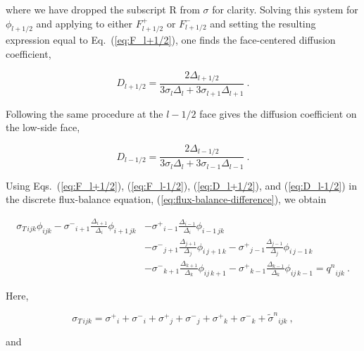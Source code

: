 \documentclass[preprint,12pt]{elsarticle}
\newcommand{\sign}{\ensuremath{\tilde{\sigma}^n}}
\newcommand{\qn}{\ensuremath{q^n}} \newcommand{\Tn}{\ensuremath{T^n}}
\newcommand{\Di}{\ensuremath{\Delta_i}}
\newcommand{\Dj}{\ensuremath{\Delta_j}}
\newcommand{\Dk}{\ensuremath{\Delta_k}}
\newcommand{\sigT}{\ensuremath{\sigma_{T\,ijk}}}
\newcommand{\sigm}{\ensuremath{\sigma^{-}}}
\newcommand{\sigp}{\ensuremath{\sigma^{+}}}
\begin{document}
where we have dropped the subscript $\mathrm{R}$ from $\sigma$ for
clarity.  Solving this system for $\phi_{l+1/2}$ and applying to
either $F_{l+1/2}^{+}$ or $F_{l+1/2}^{-}$ and setting the resulting
expression equal to Eq.~(\ref{eq:F_l+1/2}), one finds the
face-centered diffusion coefficient,

\begin{equation}
  D_{l+1/2} = \frac{2\Delta_{l+1/2}}{3\sigma_l\Delta_l +
    3\sigma_{l+1}\Delta_{l+1}}\:.
  \label{eq:D_l+1/2}
\end{equation}

Following the same procedure at the $l-1/2$ face gives the diffusion
coefficient on the low-side face,

\begin{equation}
  D_{l-1/2} = \frac{2\Delta_{l-1/2}}{3\sigma_l\Delta_l +
    3\sigma_{l-1}\Delta_{l-1}}\:.
  \label{eq:D_l-1/2} 
\end{equation}

Using Eqs.~(\ref{eq:F_l+1/2}), (\ref{eq:F_l-1/2}), (\ref{eq:D_l+1/2}),
and (\ref{eq:D_l-1/2}) in the discrete flux-balance equation,
(\ref{eq:flux-balance-difference}), we obtain

\begin{equation}
  \begin{aligned}
    \sigT\phi_{ijk} -
    \sigm_{i+1}\frac{\Delta_{i+1}}{\Di}\phi_{i+1\,jk} & -
    \sigp_{i-1}\frac{\Delta_{i-1}}{\Di}\phi_{i-1\,jk}\\ &-
    \sigm_{j+1}\frac{\Delta_{j+1}}{\Dj}\phi_{i\,j+1\,k} -
    \sigp_{j-1}\frac{\Delta_{j-1}}{\Dj}\phi_{i\,j-1\,k}\\ &-
    \sigm_{k+1}\frac{\Delta_{k+1}}{\Dk}\phi_{ij\,k+1} -
    \sigp_{k-1}\frac{\Delta_{k-1}}{\Dk}\phi_{ij\,k-1} = \qn_{ijk}\:.
  \end{aligned}
  \label{eq:discrete-diffusion}
\end{equation}

Here,

\begin{equation}
  \sigT = \sigp_i + \sigm_i + \sigp_j + \sigm_j + \sigp_k + \sigm_k +
  \sign_{ijk}\:,
\end{equation}

and
\end{document}
